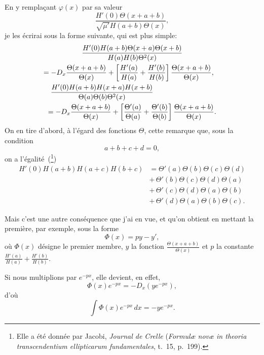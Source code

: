 \documentclass[11pt,leqno,oneside,letterpaper]{book}[2005/09/16]
\begin{document}
En y rempla\c{c}ant $\varphi(x)$ par sa valeur
\[
\frac{H'(0) \Theta(x+a+b)}{\sqrt{\mu'}H(a+b)\Theta(x)},
\]
je les \'ecrirai
sous la forme suivante, qui est plus simple:
\begin{multline*}
\frac{H'(0) H(a+b) \Theta(x+a) \Theta(x+b)}{H(a)H(b)\Theta^2(x)} \\
\shoveright{=
- D_x \frac{\Theta(x+a+b)}{\Theta(x)}
+ \left[ \frac{H'(a)}{H(a)} + \frac{H'(b)}{H(b)} \right]
\frac{\Theta(x+a+b)}{\Theta(x)}, }
\\
\shoveleft{
\frac{H'(0) H(a+b) H(x+a) H(x+b)}{\Theta(a)\Theta(b)\Theta^2(x)} }\\
=
- D_x \frac{\Theta(x+a+b)}{\Theta(x)}
+ \left[ \frac{\Theta'(a)}{\Theta(a)} + \frac{\Theta'(b)}{\Theta(b)} \right]
\frac{\Theta(x+a+b)}{\Theta(x)} .
\end{multline*}
On en tire d'abord, \`a l'\'egard des fonctions $\Theta$, cette remarque que, sous la
condition
\[
a+b+c+d=0,
\]
on a l'\'egalit\'e~(\footnote{Elle a \'et\'e donn\'ee par Jacobi, \textit{Journal de Crelle} (\textit{Formul{\ae} nov{\ae} in theoria transcendentium
ellipticarum fundamentales}, t.~15, p.~199).})
\begin{align*}
H'(0) H(a+b) H(a+c) H(b+c)
&= \Theta'(a) \Theta(b) \Theta(c) \Theta(d) \\
&+\, \Theta'(b) \Theta(c) \Theta(d) \Theta(a) \\
&+\, \Theta'(c) \Theta(d) \Theta(a) \Theta(b) \\
&+\, \Theta'(d) \Theta(a) \Theta(b) \Theta(c).
\end{align*}

Mais c'est une autre cons\'equence que j'ai en vue, et qu'on obtient en
mettant la premi\`ere, par exemple, sous la forme
\[
\Phi(x) = py - y',
\]
o\`u $\Phi(x)$ d\'esigne le premier membre, $y$ la fonction $\frac{\Theta(x+a+b)}{\Theta(x)}$ et $p$ la
constante $\frac{H'(a)}{H(a)}+\frac{H'(b)}{H(b)}$.

Si nous multiplions par $e^{-px}$, elle devient, en effet,
\[
\Phi(x)e^{-px} = -D_x (y e^{-px}),
\]
d'o\`u
\[
\int \Phi(x) e^{-px}\, dx = -y e^{-px}.
\]
\end{document}
